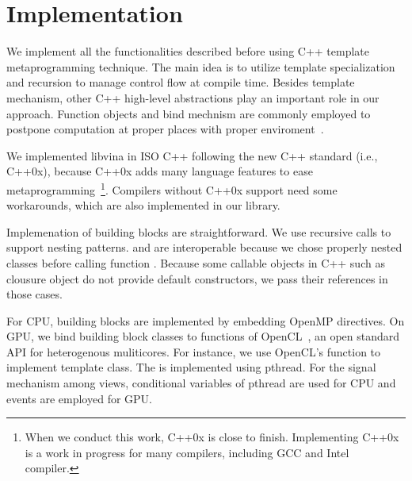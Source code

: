 \section{Implementation}
\label{sec:details}

We implement all the functionalities described before using C++
template metaprogramming technique.
The main idea is to utilize
template specialization and recursion to manage control flow at
compile time. Besides template mechanism, other C++ high-level
abstractions play an important role in our approach.
Function objects and bind mechnism are commonly employed to postpone computation
at proper places with proper enviroment~\cite{moderncpp}.

We implemented libvina in ISO C++ following the new C++ standard (i.e., C++0x\cite{c++0x}),
because C++0x adds many language features to ease metaprogramming~\footnote{When
we conduct this work, C++0x is close to finish. Implementing C++0x is a work in
progress for many compilers, including GCC and Intel compiler.}. Compilers
without C++0x support need some workarounds, which are also implemented in our
library.

Implemenation of building blocks are straightforward. We use recursive calls
to support nesting patterns.  and  are interoperable
because we chose properly nested classes before calling function .
Because some callable objects in C++ such as clousure object
do not provide default constructors, we pass their
references in those cases. 

For CPU, building blocks are implemented by embedding OpenMP directives. On GPU, we bind
building block classes to functions of OpenCL~\cite{opencl}, an open standard API
for heterogenous muliticores. For instance, we use OpenCL's  function
to implement  template class. The  is implemented using pthread.
For the signal mechanism among views, conditional variables of pthread are used
for CPU and events are employed for GPU.


